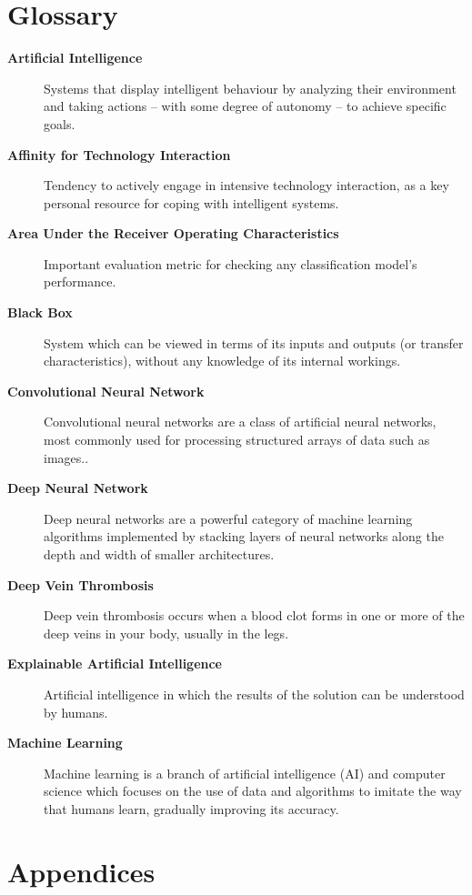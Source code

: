 {}
\chapter*{Glossary}
\begin{description}
    \item [\textbf{Artificial Intelligence}] Systems that display intelligent behaviour by analyzing their environment and taking actions – with some degree of autonomy – to achieve specific goals.
    \item [\textbf{Affinity for Technology Interaction}] Tendency to actively engage in intensive technology interaction, as a key personal resource for coping with intelligent systems.
    \item [\textbf{Area Under the Receiver Operating Characteristics}] Important evaluation metric for checking any classification model’s performance.
    \item [\textbf{Black Box}] System which can be viewed in terms of its inputs and outputs (or transfer characteristics), without any knowledge of its internal workings.
    \item [\textbf{Convolutional Neural Network}] Convolutional neural networks are a class of artificial neural networks, most commonly used for processing structured arrays of data such as images..
    \item [\textbf{Deep Neural Network}] Deep neural networks are a powerful category of machine learning algorithms implemented by stacking layers of neural networks along the depth and width of smaller architectures.
    \item [\textbf{Deep Vein Thrombosis}] Deep vein thrombosis occurs when a blood clot forms in one or more of the deep veins in your body, usually in the legs.
    \item [\textbf{Explainable Artificial Intelligence}] Artificial intelligence in which the results of the solution can be understood by humans.
    \item [\textbf{Machine Learning}] Machine learning is a branch of artificial intelligence (AI) and computer science which focuses on the use of data and algorithms to imitate the way that humans learn, gradually improving its accuracy.
\end{description}
\clearpage

{}
\chapter*{Appendices}

